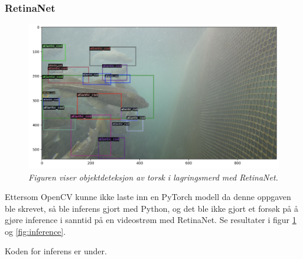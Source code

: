 \subsubsection{RetinaNet}

\begin{figure}
\begin{center} 
\includegraphics[scale=0.35]{figures/retinanet_cod}
\caption{\small \sl Figuren viser objektdeteksjon av torsk i lagringsmerd med RetinaNet. \label{fig:retinenet_inference}} 
\end{center} 
\end{figure} 

Ettersom OpenCV kunne ikke laste inn en PyTorch modell da denne oppgaven ble skrevet, så ble inferens gjort med Python, og det ble ikke gjort et forsøk på å gjøre inference i sanntid på en videostrøm med RetinaNet. Se resultater i figur \ref{fig:retinenet_inference} og \ref{fig:inference}.

Koden for inferens er under.

